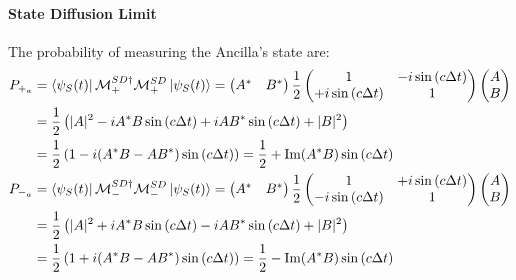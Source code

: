 \documentclass[a4paper,12pt]{article}
\begin{document}
\paragraph{State Diffusion Limit}
The probability of measuring the Ancilla's state are:
\begin{align}
	P_{+_{a}} &= \bra{\psi_{S} (t)} \mathcal{M}_{+}^{SD \dagger} \mathcal{M}_{+}^{SD} \ket{\psi_{S}(t)} = \begin{pmatrix} A^* & B^* \end{pmatrix} \frac{1}{2} \begin{pmatrix} 1 & -i \sin \left(c \Delta t\right) \\ +i \sin \left(c \Delta t\right) & 1 \end{pmatrix} \begin{pmatrix} A \\ B \end{pmatrix} \notag \\
	&= \frac{1}{2} \left(| A |^{2} - i A^* B \sin \left(c \Delta t \right) + i A B^* \sin \left(c \Delta t \right) + | B |^{2} \right) \notag \\
	&= \frac{1}{2} \left( 1 - i(A^*B - AB^*) \sin \left(c \Delta t \right) \right) = \frac{1}{2} + \text{Im}(A^*B) \sin \left(c \Delta t \right) \\
	P_{-_{a}} &= \bra{\psi_{S} (t)} \mathcal{M}_{-}^{SD \dagger} \mathcal{M}_{-}^{SD} \ket{\psi_{S}(t)} = \begin{pmatrix} A^* & B^* \end{pmatrix} \frac{1}{2} \begin{pmatrix} 1 & +i \sin \left(c \Delta t\right) \\ -i \sin \left(c \Delta t\right) & 1 \end{pmatrix} \begin{pmatrix} A \\ B \end{pmatrix} \notag \\
	&= \frac{1}{2} \left(| A |^{2} + i A^* B \sin \left(c \Delta t \right) - i A B^* \sin \left(c \Delta t \right) + | B |^{2} \right) \notag \\
	&= \frac{1}{2} \left( 1 + i(A^*B - AB^*) \sin \left(c \Delta t \right) \right) = \frac{1}{2} - \text{Im}(A^*B) \sin \left(c \Delta t \right) 
\end{align}
\end{document}
